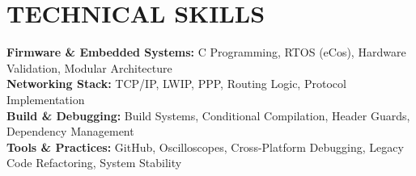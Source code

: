 \documentclass[letterpaper,11pt]{article}
\begin{document}
\section{TECHNICAL SKILLS}
 \begin{itemize}[leftmargin=0.15in, label={}]
    \small{\item{
     \textbf{Firmware \& Embedded Systems:} C Programming, RTOS (eCos), Hardware Validation, Modular Architecture \\
     \textbf{Networking Stack:} TCP/IP, LWIP, PPP, Routing Logic, Protocol Implementation \\
     \textbf{Build \& Debugging:} Build Systems, Conditional Compilation, Header Guards, Dependency Management \\
     \textbf{Tools \& Practices:} GitHub, Oscilloscopes, Cross-Platform Debugging, Legacy Code Refactoring, System Stability
    }}
 \end{itemize}


\end{document}
